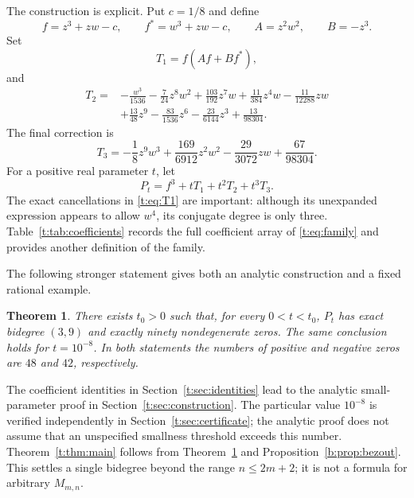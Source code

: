 \documentclass[UTF8,11pt]{ctexart}
\newtheorem{thm}{Theorem}[section]
\theoremstyle{definition}
\numberwithin{equation}{section}
\begin{document}
The construction is explicit. Put $c=1/8$ and define
\begin{equation}\label{t:eq:seed}
 f=z^3+zw-c,\qquad f^*=w^3+zw-c,\qquad
 A=z^2w^2,\qquad B=-z^3.
\end{equation}
Set
\begin{equation}\label{t:eq:T1}
 T_1=f(Af+Bf^*),
\end{equation}
and
\begin{equation}\label{t:eq:T2}
\begin{split}
 T_2={}&-\frac{w^3}{1536}-\frac{7}{24}z^8w^2
 +\frac{103}{192}z^7w+\frac{11}{384}z^4w
 -\frac{11}{12288}zw\\
 &+\frac{13}{48}z^9-\frac{83}{1536}z^6
 -\frac{23}{6144}z^3+\frac{13}{98304}.
\end{split}
\end{equation}
The final correction is
\begin{equation}\label{t:eq:T3}
 T_3=-\frac18 z^9w^3+\frac{169}{6912}z^2w^2
       -\frac{29}{3072}zw+\frac{67}{98304}.
\end{equation}
For a positive real parameter $t$, let
\begin{equation}\label{t:eq:family}
 P_t=f^3+tT_1+t^2T_2+t^3T_3.
\end{equation}
The exact cancellations in \eqref{t:eq:T1} are important: although its
unexpanded expression appears to allow $w^4$, its conjugate degree is
only three. Table~\ref{t:tab:coefficients} records the full coefficient
array of \eqref{t:eq:family} and provides another definition of the family.

The following stronger statement gives both an analytic construction
and a fixed rational example.
\begin{thm}\label{t:thm:family}
There exists $t_0>0$ such that, for every $0<t<t_0$, $P_t$ has exact
bidegree $(3,9)$ and exactly ninety nondegenerate zeros. The same
conclusion holds for $t=10^{-8}$. In both statements the numbers of
positive and negative zeros are $48$ and $42$, respectively.
\end{thm}

The coefficient identities in Section~\ref{t:sec:identities} lead to
the analytic small-parameter proof in Section~\ref{t:sec:construction}. The particular value $10^{-8}$ is
verified independently in Section~\ref{t:sec:certificate}; the analytic
proof does not assume that an unspecified smallness threshold exceeds
this number. Theorem~\ref{t:thm:main} follows from
Theorem~\ref{t:thm:family} and Proposition~\ref{b:prop:bezout}.
This settles a single bidegree beyond the range $n\le2m+2$; it is not a
formula for arbitrary $M_{m,n}$.
\end{document}
